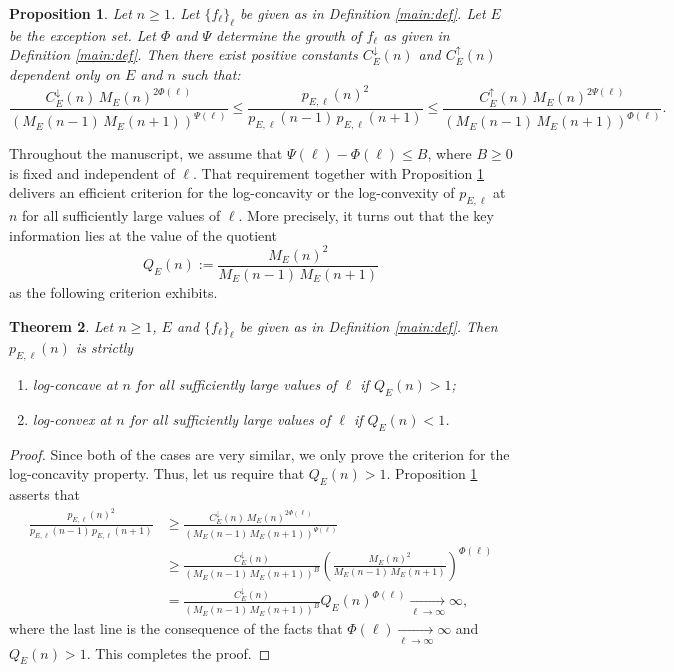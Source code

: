 \documentclass[12pt]{amsart}
\newtheorem{theorem}{Theorem}
\newtheorem{proposition}[theorem]{Proposition}
\theoremstyle{definition}
\theoremstyle{remark}
\numberwithin{theorem}{section} \numberwithin{equation}{section}
\begin{document}
\begin{proposition}\label{prop: estimations}
Let $n\geq 1$. Let $\{f_{\ell}\}_{\ell}$ be given as in Definition \ref{main:def}.
Let $E$ be the exception set.
Let $\Phi$ and $\Psi$ determine the growth of $f_{\ell}$ as given in Definition \ref{main:def}.
Then there exist positive
constants $C_{E}^{\downarrow}(n)$ and $C_{E}^{\uparrow}(n)$ 
dependent only on $E$ and $n$ such that:
\begin{equation*}
\frac{C_{E}^{\downarrow}(n) 
\, M_{E}(n)^{2 \Phi(\ell)}}{\left( M_{E}(n-1) \, M_{E}(n+1)\right)^{\Psi(\ell)}}
\leq \frac{p_{E,\ell }(n)^2}{p_{E,\ell }(n-1) \, p_{E,\ell }(n+1)} \leq 
\frac{C_{E}^{\uparrow}(n) \, M_{E}(n)^{2 \Psi(\ell)}}{\left( M_{E}(n-1) \, M_{E}(n+1)\right)^{\Phi(\ell)}}.
\end{equation*}
\end{proposition}

Throughout the manuscript, we assume that $\Psi(\ell)
-\Phi(\ell) \leq
B$, where $B
\geq 0$ is fixed and independent of $\ell$. That requirement together with Proposition \ref{prop: estimations} delivers an efficient
criterion for the log-concavity or the log-convexity of
$p_{E,\ell }$ at $n$ for all sufficiently large values of $\ell$. More precisely, it turns out that the key information
lies at the value of the quotient
\begin{equation*}
Q_{E}(n) :=\frac{M_{E}(n)^{2}}{M_{E}(n-1) \, M_{E}(n+1)}
\label{q}
\end{equation*}
as the following criterion exhibits.
\begin{theorem}\label{thm: basic}
Let $n\geq 1$, $E$ and 
$\{f_{\ell}\}_{\ell}$ be given as in Definition \ref{main:def}.
Then $p_{E,\ell }(n)$ is strictly
\begin{enumerate}
\item  log-concave at $n$ for all sufficiently large values of $\ell$ if $Q_{E}(n)>1$;
\item  log-convex at $n$ for all sufficiently large values of $\ell$ if $Q_{E}(n)<1$.
\end{enumerate}
\end{theorem}
\begin{proof}
Since both of the cases are very similar, we only prove the criterion for the log-concavity property. Thus, let us require that $Q_E(n)>1$. Proposition \ref{prop: estimations} asserts that
\begin{align*}
\frac{p_{E,\ell }(n)^2}{p_{E,\ell }(n-1) \, p_{E,\ell }(n+1)}&\geq \frac{C_{E}^{\downarrow}(n) 
\, M_{E}(n)^{2 \Phi(\ell)}}{\left( M_{E}(n-1) \, M_{E}(n+1)\right)^{\Psi(\ell)}}\\
&\geq
\frac{C_{E}^{\downarrow}(n)}{\left( M_{E}(n-1) \, M_{E}(n+1)\right)^{B
}}\left(\frac{M_{E}(n)^{2 }}{M_{E}(n-1) \, M_{E}(n+1)}\right)^{\Phi(\ell)}\\
&=\frac{C_{E}^{\downarrow}(n)}{\left( M_{E}(n-1) \, M_{E}(n+1)\right)^{
B}}Q_E(n)^{\Phi(\ell)}\xrightarrow[\ell \to \infty]{} \infty,
\end{align*} 
where the last line is the consequence of the facts that $\Phi(\ell)\xrightarrow[\ell \to \infty]{} \infty$ and $Q_E(n)>1$. This completes the proof.
\end{proof}
\end{document}
